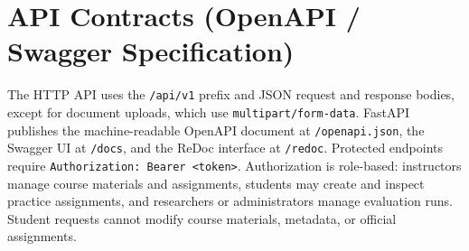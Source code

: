 \documentclass[12pt,a4paper]{article}
\begin{document}
\section{API Contracts (OpenAPI / Swagger Specification)}
\label{sec:api-contracts}

The HTTP API uses the \texttt{/api/v1} prefix and JSON request and
response bodies, except for document uploads, which use
\texttt{multipart/form-data}. FastAPI publishes the machine-readable
OpenAPI document at \texttt{/openapi.json}, the Swagger UI at
\texttt{/docs}, and the ReDoc interface at \texttt{/redoc}.
Protected endpoints require
\texttt{Authorization: Bearer \textless token\textgreater}. Authorization is
role-based: instructors manage course materials and assignments,
students may create and inspect practice assignments, and
researchers or administrators manage evaluation runs. Student
requests cannot modify course materials, metadata, or official
assignments.
\end{document}
